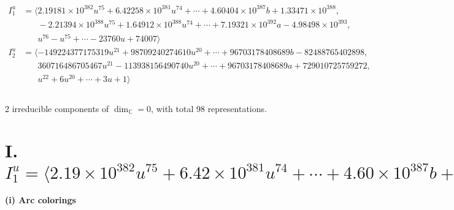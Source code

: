 \documentclass[1p]{elsarticle_modified}
\theoremstyle{definition}
\begin{document}
\begin{align*}
I^u_{1}&=\langle 
2.19181\times10^{382} u^{75}+6.42258\times10^{381} u^{74}+\cdots+4.60404\times10^{387} b+1.33471\times10^{388},\\
\phantom{I^u_{1}}&\phantom{= \langle  }-2.21394\times10^{388} u^{75}+1.64912\times10^{388} u^{74}+\cdots+7.19321\times10^{392} a-4.98498\times10^{393},\\
\phantom{I^u_{1}}&\phantom{= \langle  }u^{76}- u^{75}+\cdots-23760 u+74007\rangle \\
I^u_{2}&=\langle 
-149224377175319 u^{21}+98709240274610 u^{20}+\cdots+96703178408689 b-82488765402898,\\
\phantom{I^u_{2}}&\phantom{= \langle  }360716486705467 u^{21}-113938156490740 u^{20}+\cdots+96703178408689 a+729010725759272,\\
\phantom{I^u_{2}}&\phantom{= \langle  }u^{22}+6 u^{20}+\cdots+3 u+1\rangle \\
\\
\end{align*}
\raggedright * 2 irreducible components of $\dim_{\mathbb{C}}=0$, with total 98 representations.\\
\newpage
\renewcommand{\arraystretch}{1}
\centering \section*{I. $I^u_{1}= \langle 2.19\times10^{382} u^{75}+6.42\times10^{381} u^{74}+\cdots+4.60\times10^{387} b+1.33\times10^{388},\;-2.21\times10^{388} u^{75}+1.65\times10^{388} u^{74}+\cdots+7.19\times10^{392} a-4.98\times10^{393},\;u^{76}- u^{75}+\cdots-23760 u+74007 \rangle$}
\flushleft \textbf{(i) Arc colorings}\\
\end{document}
